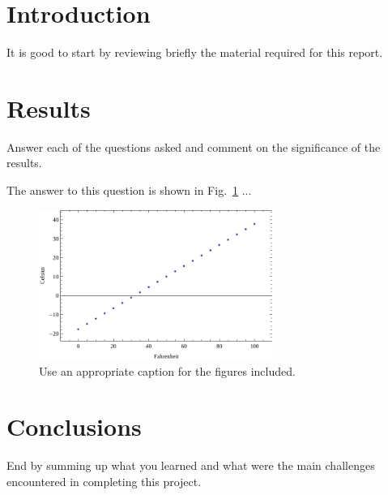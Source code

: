 \documentclass{article}
\author{\hwauthor}
\title{\hwtitle}
\date{\hwdate}
\begin{document}
\maketitle
\thispagestyle{fancy}

\section{Introduction}

It is good to start by reviewing briefly the material required for this report. 

\section{Results}

Answer each of the questions asked and comment on the significance of the results.

\bigskip
{}
\medskip

The answer to this question is shown in Fig.~\ref{fig:1} ...

\begin{figure}[b]
\begin{center}
\includegraphics[width=3in]{week1proj/report/fig.pdf}
\end{center}
\caption{Use an appropriate caption for the figures included.}
\label{fig:1}
\end{figure}

\section{Conclusions}

End by summing up what you learned and what were the main challenges encountered in completing this project.
\end{document}
